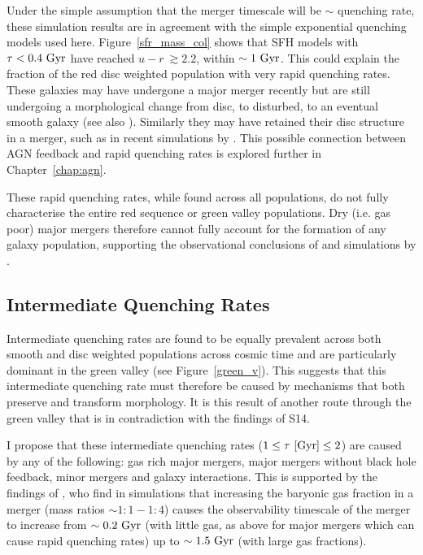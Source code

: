 Under the simple assumption that the merger timescale will be $\sim$ quenching rate, these simulation results are in agreement with the simple exponential quenching models used here. Figure~\ref{sfr_mass_col} shows that SFH models with $\tau < 0.4~\rm{Gyr}$ have reached $u-r ~\gtrsim 2.2$, within $\sim1~\rm{Gyr}$. This could explain the fraction of the red disc weighted population with very rapid quenching rates. These galaxies may have undergone a major merger recently but are still undergoing a morphological change from disc, to disturbed, to an eventual smooth galaxy (see also \citealt{vdW09}). Similarly they may have retained their disc structure in a merger, such as in recent simulations by \citet{pontzen16}. This possible connection between AGN feedback and rapid quenching rates is explored further in Chapter~\ref{chap:agn}. 

These rapid quenching rates, while found across all populations, do not fully characterise the entire red sequence or green valley populations. Dry (i.e. gas poor) major mergers therefore cannot fully account for the formation of any galaxy population, supporting the observational conclusions of \citet{Bell07,Bundy07, kaviraj14a} and simulations by \citet{Genel08}. 

\subsection{Intermediate Quenching Rates}\label{int}

Intermediate quenching rates are found to be equally prevalent across both smooth and disc weighted populations across cosmic time and are particularly dominant in the green valley (see Figure~\ref{green_v}). This suggests that this intermediate quenching rate must therefore be caused by mechanisms that both preserve and transform morphology. It is this result of another route through the green valley that is in contradiction with the findings of S14. 

I propose that these intermediate quenching rates ($1 \leq \tau~\rm{[Gyr]} \leq 2$) are caused by any of the following: gas rich major mergers, major mergers without black hole feedback, minor mergers and galaxy interactions. This is supported by the findings of \citet{Lotz11}, who find in simulations that increasing the baryonic gas fraction in a merger (mass ratios $\sim 1:1-1:4$) causes the observability timescale of the merger to increase from $\sim0.2~\rm{Gyr}$ (with little gas, as above for major mergers which can cause rapid quenching rates) up to $\sim1.5~\rm{Gyr}$ (with large gas fractions). 

